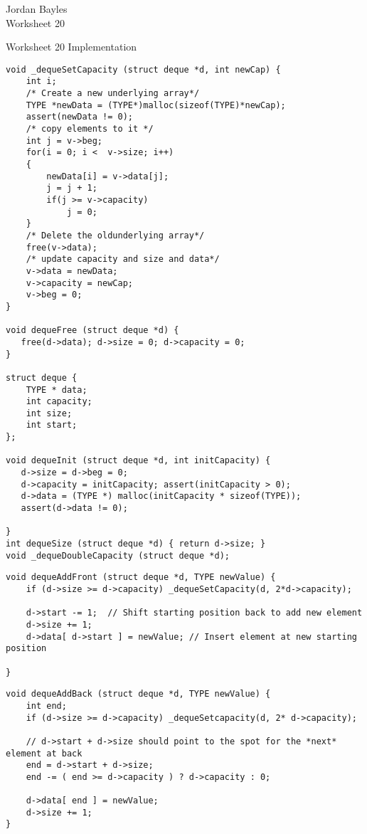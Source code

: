 \documentclass[12pt,letterpaper]{article}
\author{Jordan Bayles}
\title{}
\begin{document}

\begin{flushright}
Jordan Bayles\\
Worksheet 20\\
\end{flushright}
\begin{center}
Worksheet 20 Implementation
\end{center}

\begin{lstlisting}
void _dequeSetCapacity (struct deque *d, int newCap) {
	int i;
	/* Create a new underlying array*/
	TYPE *newData = (TYPE*)malloc(sizeof(TYPE)*newCap);
	assert(newData != 0);
	/* copy elements to it */
	int j = v->beg;
	for(i = 0; i <  v->size; i++)
	{
		newData[i] = v->data[j];
		j = j + 1;
		if(j >= v->capacity)
			j = 0;
	}
	/* Delete the oldunderlying array*/
	free(v->data);
	/* update capacity and size and data*/
	v->data = newData;
	v->capacity = newCap;
	v->beg = 0;
}

void dequeFree (struct deque *d) {
   free(d->data); d->size = 0; d->capacity = 0;
}

struct deque {
	TYPE * data;
	int capacity;
	int size;
	int start;
};

void dequeInit (struct deque *d, int initCapacity) {
   d->size = d->beg = 0;
   d->capacity = initCapacity; assert(initCapacity > 0);
   d->data = (TYPE *) malloc(initCapacity * sizeof(TYPE));
   assert(d->data != 0);

}
int dequeSize (struct deque *d) { return d->size; }
void _dequeDoubleCapacity (struct deque *d);  
\end{lstlisting}
\newpage
{}
\begin{lstlisting}
void dequeAddFront (struct deque *d, TYPE newValue) {
	if (d->size >= d->capacity) _dequeSetCapacity(d, 2*d->capacity);
	
	d->start -= 1;	// Shift starting position back to add new element
	d->size += 1;
	d->data[ d->start ] = newValue;	// Insert element at new starting position
	
}
\end{lstlisting}

\begin{lstlisting}
void dequeAddBack (struct deque *d, TYPE newValue) {
	int end;
    if (d->size >= d->capacity) _dequeSetcapacity(d, 2* d->capacity);
    
    // d->start + d->size should point to the spot for the *next* element at back
    end = d->start + d->size;
    end -= ( end >= d->capacity ) ? d->capacity : 0;
    
    d->data[ end ] = newValue;
    d->size += 1;
}
\end{lstlisting}
\end{document}
